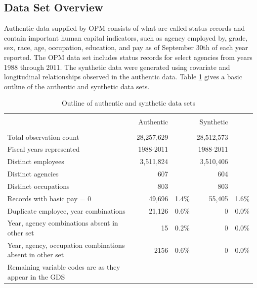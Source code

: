 \documentclass[10pt, letterpaper]{article}
\begin{document}
\begin{spacing}{1.0}
\clearpage

\section{Data Set Overview}

Authentic data supplied by OPM consists of what are called status records and contain important human capital indicators, such as agency employed by, grade, sex, race, age, occupation, education, and pay as of September 30th of each year reported.  The OPM data set includes status records for select agencies from years 1988 through 2011.  The synthetic data were generated using covariate and longitudinal relationships observed in the authentic data.  Table \ref{table:DataSetReview} gives a basic outline of the authentic and synthetic data sets.\\

\begin{table}[h]
    \centering
    \caption{Outline of authentic and synthetic data sets}
    \label{table:DataSetReview}
    \begin{tabular}{lrrrr}
        \hline\\[-10pt]
        & Authentic & & Synthetic & \\
        \hline\\[-6pt]
        Total observation count & 28,257,629 & & 28,512,573 & \\
        Fiscal years represented & 1988-2011 & & 1988-2011 & \\
        Distinct employees & 3,511,824 & & 3,510,406 & \\
        Distinct agencies & 607 & & 604 & \\
        Distinct occupations & 803 & & 803 & \\
        Records with basic pay = 0 &  49,696 & 1.4\% & 55,405 & 1.6\% \\
        Duplicate employee, year combinations & 21,126 & 0.6\% & 0 & 0.0\% \\
        Year, agency combinations absent in other set & 15 & 0.2\% & 0 & 0.0\% \\
        Year, agency, occupation combinations absent in other set & 2156 & 0.6\% & 0 & 0.0\% \\
        Remaining variable codes are as they appear in the GDS & & & & \\[4pt]
        \hline
    \end{tabular}
\end{table}


\end{spacing}
\end{document}
